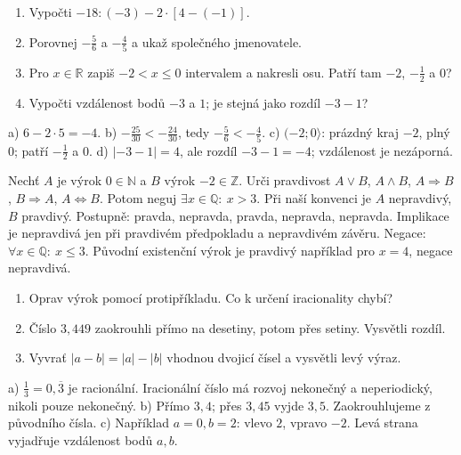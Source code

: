 \documentclass[11pt,a4paper]{article}
\begin{document}

\begin{zadaniReseniBox}[title={Samostatná práce 1},breakable=false]
\begin{enumerate}[label=\alph*)]
\item Vypočti $-18:(-3)-2\cdot[4-(-1)]$.
\item Porovnej $-\frac56$ a $-\frac45$ a ukaž společného jmenovatele.
\item Pro $x\in\mathbb R$ zapiš $-2<x\le0$ intervalem a nakresli osu.
Patří tam $-2$, $-\frac12$ a $0$?
\item Vypočti vzdálenost bodů $-3$ a $1$; je stejná jako rozdíl $-3-1$?
\end{enumerate}
\tcblower
a) $6-2\cdot5=-4$.
b) $-\frac{25}{30}<-\frac{24}{30}$, tedy $-\frac56<-\frac45$.
c) $(-2;0\rangle$: prázdný kraj $-2$, plný $0$; patří $-\frac12$ a $0$.
d) $|-3-1|=4$, ale rozdíl $-3-1=-4$; vzdálenost je nezáporná.
\end{zadaniReseniBox}

\begin{zadaniReseniBox}[title={Samostatná práce 2},breakable=false]
Nechť $A$ je výrok $0\in\mathbb N$ a $B$ výrok $-2\in\mathbb Z$.
Urči pravdivost $A\lor B$, $A\land B$, $A\Rightarrow B$, $B\Rightarrow A$,
$A\Leftrightarrow B$. Potom neguj $\exists x\in\mathbb Q:\ x>3$.
\tcblower
Při naší konvenci je $A$ nepravdivý, $B$ pravdivý.
Postupně: pravda, nepravda, pravda, nepravda, nepravda.
Implikace je nepravdivá jen při pravdivém předpokladu a nepravdivém závěru.
Negace: $\forall x\in\mathbb Q:\ x\le3$.
Původní existenční výrok je pravdivý například pro $x=4$, negace nepravdivá.
\end{zadaniReseniBox}

\begin{zadaniReseniBox}[title={Rozšíření 1},breakable=false]
\begin{enumerate}[label=\alph*)]
\item Oprav výrok 
pomocí protipříkladu. Co k určení iracionality chybí?
\item Číslo $3{,}449$ zaokrouhli přímo na desetiny, potom přes setiny.
Vysvětli rozdíl.
\item Vyvrať $|a-b|=|a|-|b|$ vhodnou dvojicí čísel a vysvětli levý výraz.
\end{enumerate}
\tcblower
a) $\frac13=0{,}\overline3$ je racionální. Iracionální číslo má rozvoj
nekonečný a neperiodický, nikoli pouze nekonečný.
b) Přímo $3{,}4$; přes $3{,}45$ vyjde $3{,}5$. Zaokrouhlujeme z původního čísla.
c) Například $a=0,b=2$: vlevo $2$, vpravo $-2$.
Levá strana vyjadřuje vzdálenost bodů $a,b$.
\end{zadaniReseniBox}
\end{document}
